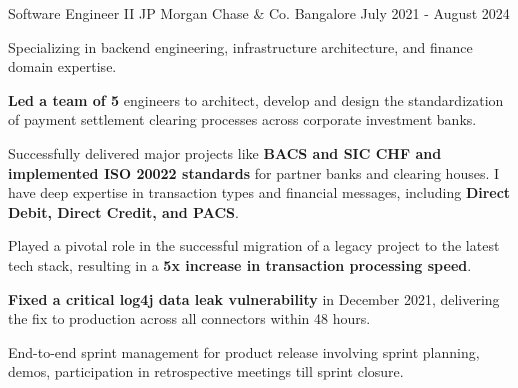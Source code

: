 
\begin{cventries}

  \cventry
    {Software Engineer II} %
    {JP Morgan Chase \& Co.} %
    {Bangalore} %
    {July 2021 - August 2024} %
    {
      \begin{cvitems} %
        \item {Specializing in backend engineering, infrastructure architecture, and finance domain expertise.}
        \item {\textbf{Led a team of 5} engineers to architect, develop and design the standardization of payment settlement clearing processes across corporate investment banks.}
        \item {Successfully delivered major projects like \textbf{BACS and SIC CHF and implemented ISO 20022 standards} for partner banks and clearing houses. I have deep expertise in transaction types and financial messages, including \textbf{Direct Debit, Direct Credit, and PACS}.}
        \item {Played a pivotal role in the successful migration of a legacy project to the latest tech stack, resulting in a \textbf{5x increase in transaction processing speed}.}
        \item {\textbf{Fixed a critical log4j data leak vulnerability} in December 2021, delivering the fix to production across all connectors within 48 hours.}
        \item {End-to-end sprint management for product release involving sprint planning, demos, participation in retrospective meetings till sprint closure.}
      \end{cvitems}
    }


\end{cventries}
